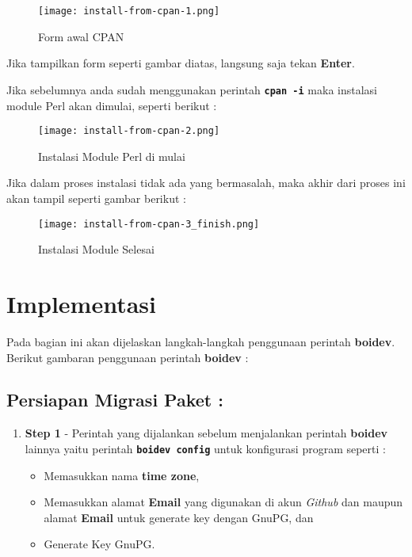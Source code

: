 {\begin{figure}[H]
	\centering
	\texttt{[image: install-from-cpan-1.png]}
	\caption{Form awal CPAN}
	\label{fig:bab2_form_awal_cpan}
\end{figure}

\noindent
Jika tampilkan form seperti gambar diatas, langsung saja tekan \textbf{Enter}.

\noindent
Jika sebelumnya anda sudah menggunakan perintah \textbf{\texttt{cpan -i}} maka instalasi module Perl akan dimulai, seperti berikut :

\begin{figure}[H]
	\centering
	\texttt{[image: install-from-cpan-2.png]}
	\caption{Instalasi Module Perl di mulai}
	\label{fig:bab2_start_install_module}
\end{figure}

\noindent
Jika dalam proses instalasi tidak ada yang bermasalah, maka akhir dari proses ini akan tampil seperti gambar berikut :

\begin{figure}[H]
	\centering
	\texttt{[image: install-from-cpan-3\_finish.png]}
	\caption{Instalasi Module Selesai}
	\label{fig:bab1_finish_install_module}
\end{figure}

\pagebreak
\section{Implementasi}
\label{subsec:implm}
\noindent
Pada bagian ini akan dijelaskan langkah-langkah penggunaan perintah \textbf{boidev}. Berikut gambaran penggunaan perintah \textbf{boidev} :

\subsection{Persiapan Migrasi Paket :}
\begin{enumerate}
	\item \textbf{Step 1} - Perintah yang dijalankan sebelum menjalankan perintah \textbf{boidev} lainnya yaitu perintah \textbf{\texttt{boidev config}} untuk konfigurasi program seperti :
	\label{itm:pre_step1}
	\begin{itemize}
		\item Memasukkan nama \textbf{time zone},
		\item Memasukkan alamat \textbf{Email} yang digunakan di akun \textit{Github} dan maupun alamat \textbf{Email} untuk generate key dengan GnuPG, dan
		\item Generate Key GnuPG.
	\end{itemize}
	

\end{enumerate}}

